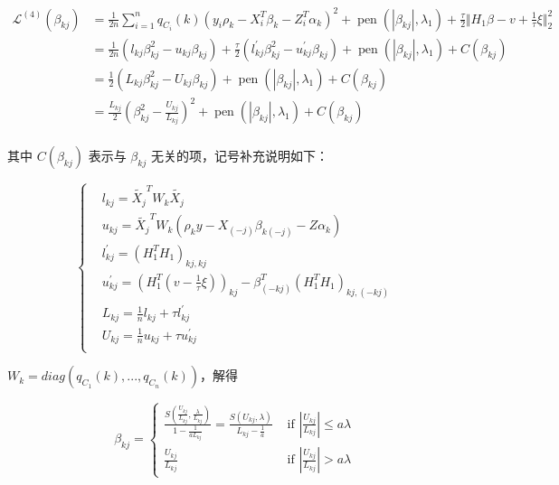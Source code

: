 \documentclass[12pt, a4paper, oneside]{article}
\numberwithin{equation}{section}
\begin{document}
\begin{equation}
	\begin{aligned}
		\mathcal{L}^{(4)}(\beta_{kj})&=\frac{1}{2n}\sum_{i=1}^{n} q_{C_i}(k)\left(y_i\rho_k - X_i^T \beta_k - Z_i^T \alpha_k \right)^2 + \operatorname{pen}\left(|\beta_{kj}|, \lambda_{1}\right)+\frac{\tau}{2}\Vert H_1 \beta - v + \frac{1}{\tau}\xi\Vert_2^2 \\
		&= \frac{1}{2n}\left(l_{kj}\beta_{kj}^2 - u_{kj}\beta_{kj}\right) + \frac{\tau}{2}\left(l^\prime_{kj}\beta_{kj}^2 - u^\prime_{kj}\beta_{kj}\right) + \operatorname{pen}\left(|\beta_{kj}|, \lambda_{1}\right) + C(\beta_{kj}) \\
		&= \frac{1}{2}\left(L_{kj}\beta_{kj}^2 - U_{kj}\beta_{kj}\right) + \operatorname{pen}\left(|\beta_{kj}|, \lambda_{1}\right) + C(\beta_{kj}) \\
		&= \frac{L_{kj}}{2}\left(\beta_{kj}^2 - \frac{U_{kj}}{L_{kj}}\right)^2 + \operatorname{pen}\left(|\beta_{kj}|, \lambda_{1}\right) + C(\beta_{kj}) \\
	\end{aligned} 	
\end{equation}

其中 $C(\beta_{kj})$ 表示与 $\beta_{kj}$ 无关的项，记号补充说明如下：

\begin{equation}
	\left\{
	\begin{aligned}
		&l_{kj} = \tilde{X_j}^T W_k \tilde{X_j} \\
		&u_{kj} = \tilde{X_j}^T W_k \left(\rho_k y - X_{(-j)}\beta_{k(-j)} - Z\alpha_k\right) \\
		&l^\prime_{kj} = (H_1^T H_1)_{kj,kj} \\
		&u^\prime_{kj} = \left(H_1^T(v-\frac{1}{\tau}\xi)\right)_{kj} - \beta_{(-kj)}^T(H_1^T H_1)_{kj,(-kj)} \\
		&L_{kj} = \frac1n l_{kj} + \tau l^\prime_{kj} \\
		&U_{kj} = \frac1n u_{kj} + \tau u^\prime_{kj} \\
	\end{aligned}
	\right.
\end{equation}

$W_k = diag(q_{C_1}(k),...,q_{C_n}(k))$，解得

\begin{equation}
	\beta_{kj} = 
	\begin{cases}
		\frac{S\left(\frac{U_{kj}}{L_{kj}}, \frac{\lambda}{L_{kj}}\right)}{1-\frac{1}{aL_{kj}}} = 
		\frac{S\left(U_{kj}, \lambda\right)}{L_{kj}-\frac{1}{a}} & \text { if }|\frac{U_{kj}}{L_{kj}}| \leq a \lambda \\ 
		\frac{U_{kj}}{L_{kj}} & \text { if }|\frac{U_{kj}}{L_{kj}}|>a \lambda
	\end{cases}
\end{equation}
\end{document}
